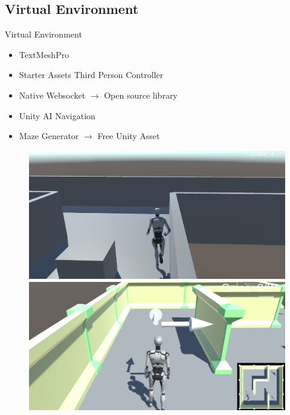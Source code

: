 \subsection*{Virtual Environment}
\begin{frame}{Virtual Environment}
    \begin{minipage}[c]{.6\textwidth}
        \begin{itemize}
            \item TextMeshPro
            \item Starter Assets \textemdash{} Third Person Controller
            \item Native Websocket $\xrightarrow{}$ Open source library
            \item Unity AI Navigation
            \item Maze Generator $\xrightarrow{}$ Free Unity Asset
        \end{itemize}
    \end{minipage}
    \begin{minipage}[c]{.39\textwidth}
        \begin{figure}[!htbp]
            \centering
            \includegraphics[width=\textwidth]{figures/Methodology/infinite_runner}
            \includegraphics[width=\textwidth]{figures/Methodology/maze}
        \end{figure}
    \end{minipage}
\end{frame}
